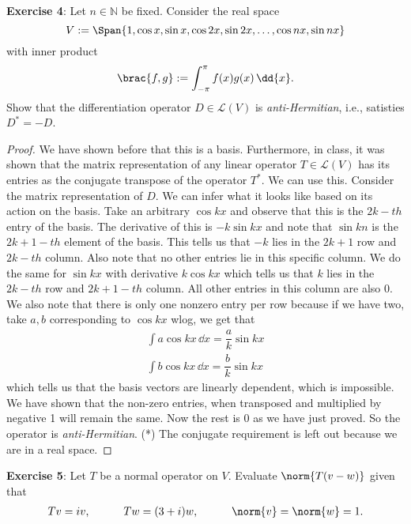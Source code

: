 \documentclass{article}
\begin{document}
\textbf{Exercise 4}: Let $n \in \mathbb{N}$ be fixed. Consider the real space 
\begin{equation*}
	V:= \Span\{1, \cos{x}, \sin{x, \cos{2x},\sin{2x}, \ldots, \cos{nx}, \sin{nx}}\} 
\end{equation*}
with inner product
\begin{equation*}
	\brac{f,g} := \int_{-\pi}^{\pi}f(x)g(x) \,\dd{x}.
\end{equation*}
Show that the differentiation operator $D \in \mathcal{L}(V)$ is \textit{anti-Hermitian}, i.e., satisties $D^{*} = -D$.

\begin{proof}
	We have shown before that this is a basis. Furthermore, in class, it was shown that the matrix representation of any linear operator $T \in \mathcal{L}(V)$ has its entries as the conjugate transpose of the operator $T^{*}$. We can use this. Consider the matrix representation of $D$. We can infer what it looks like based on its action on the basis. Take an arbitrary $\cos{kx}$ and observe that this is the $2k-th$ entry of the basis. The derivative of this is $-k\sin{kx}$ and note that $\sin{kn}$ is the $2k + 1-th$ element of the basis. This tells us that $-k$ lies in the $2k + 1$ row and $2k-th$ column. Also note that no other entries lie in this specific column. We do the same for $\sin{kx}$ with derivative $k\cos{kx}$ which tells us that $k$ lies in the $2k-th$ row and $2k + 1-th$ column. All other entries in this column are also 0. We also note that there is only one nonzero entry per row because if we have two, take $a, b$ corresponding to $\cos{kx}$ wlog, we get that 
	\begin{align*}
		\int{a\cos{kx}} \, \dd{x} = \dfrac{a}{k}\sin{kx} \\
		\int{b\cos{kx}} \, \dd{x} = \dfrac{b}{k}\sin{kx}
	\end{align*}
which tells us that the basis vectors are linearly dependent, which is impossible. We have shown that the non-zero entries, when transposed and multiplied by negative 1 will remain the same. Now the rest is 0 as we have just proved. So the operator is \textit{anti-Hermitian}. (*) The conjugate requirement is left out because we are in a real space. 
\end{proof}

\textbf{Exercise 5}: Let $T$ be a normal operator on $V$. Evaluate $\norm{T(v - w)}$ given that 
\begin{align*}
	Tv = iv, \hspace{30pt} Tw = (3 + i)w, \hspace{30pt} \norm{v} = \norm{w} = 1.  
\end{align*}
\end{document}
